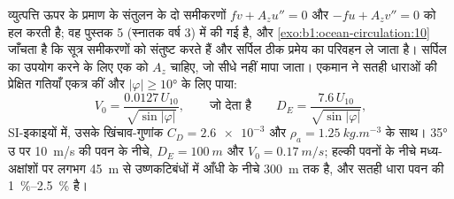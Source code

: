 व्युत्पत्ति ऊपर के प्रमाण के संतुलन के दो समीकरणों $f v + A_z u'' = 0$ और $-f u + A_z v'' =
0$ को हल करती है; वह पुस्तक 5 (स्नातक वर्ष 3) में की गई है, और \cref{exo:b1:ocean-circulation:10} जाँचता है कि सूत्र समीकरणों को संतुष्ट करते हैं और सर्पिल ठीक प्रमेय का परिवहन ले जाता है।
सर्पिल का उपयोग करने के लिए एक को $A_z$ चाहिए, जो सीधे नहीं मापा जाता। एकमान ने सतही धाराओं की प्रेक्षित गतियाँ एकत्र कीं और $|\varphi| \geq \ang{10}$ के लिए पाया:
\[
  V_0 = \frac{0.0127\,U_{10}}{\sqrt{\sin|\varphi|}},
  \qquad\text{जो देता है}\qquad
  D_E = \frac{7.6\,U_{10}}{\sqrt{\sin|\varphi|}},
\]
SI-इकाइयों में, उसके खिंचाव-गुणांक $C_D = \num{2.6e-3}$ और $\rho_a =
\qty{1.25}{kg.m^{-3}}$ के साथ। \ang{35} उ पर \qty{10}{m/s} की पवन के नीचे, $D_E =
\qty{100}{m}$ और $V_0 = \qty{0.17}{m/s}$;  हल्की पवनों के नीचे मध्य-अक्षांशों पर लगभग \qty{45}{m} से उष्णकटिबंधों में आँधी के नीचे \qty{300}{m} तक है, और सतही धारा पवन की \qtyrange{1}{2.5}{\percent} है।

